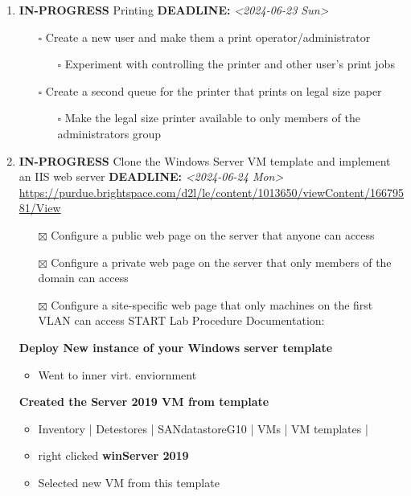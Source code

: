 \documentclass[letterpaper]{article}
\begin{document}
\begin{enumerate}
\item {\bfseries\sffamily IN-PROGRESS} Printing
\label{sec:orgacf7af5}
\noindent\textbf{DEADLINE:} \textit{<2024-06-23 Sun>}\\[0pt]
\begin{itemize}
\item[{$\square$}] Create a new user and make them a print operator/administrator
\begin{itemize}
\item[{$\square$}] Experiment with controlling the printer and other user’s print jobs
\end{itemize}
\item[{$\square$}] Create a second queue for the printer that prints on legal size paper
\begin{itemize}
\item[{$\square$}] Make the legal size printer available to only members of the administrators group
\end{itemize}
\end{itemize}
\item {\bfseries\sffamily IN-PROGRESS} Clone the Windows Server VM template and implement an IIS web server
\label{sec:orgb0d7e06}
\noindent\textbf{DEADLINE:} \textit{<2024-06-24 Mon>}\\[0pt]
\url{https://purdue.brightspace.com/d2l/le/content/1013650/viewContent/16679581/View}
\begin{itemize}
\item[{$\boxtimes$}] Configure a public web page on the server that anyone can access
\item[{$\boxtimes$}] Configure a private web page on the server that only members of the domain can access
\item[{$\boxtimes$}] Configure a site-specific web page that only machines on the first VLAN can access
START Lab Procedure Documentation:
\end{itemize}
\textbf{Deploy New instance of your Windows server template}
\begin{itemize}
\item Went to inner virt. enviornment
\end{itemize}
\textbf{Created the Server 2019 VM from template}
\begin{itemize}
\item Inventory | Detestores | SANdatastoreG10 | VMs | VM templates |
\item right clicked \textbf{winServer 2019}
\item Selected new VM from this template

\end{itemize}
\end{enumerate}
\end{document}
